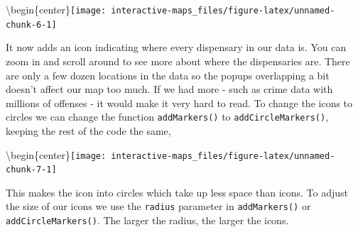 \documentclass[
  12pt,
]{book}
\newenvironment{Shaded}{\begin{snugshade}}{\end{snugshade}}
\newcommand{\DataTypeTok}[1]{\textcolor[rgb]{0.13,0.29,0.53}{#1}}
\newcommand{\DecValTok}[1]{\textcolor[rgb]{0.00,0.00,0.81}{#1}}
\newcommand{\KeywordTok}[1]{\textcolor[rgb]{0.13,0.29,0.53}{\textbf{#1}}}
\newcommand{\NormalTok}[1]{#1}
\newcommand{\OperatorTok}[1]{\textcolor[rgb]{0.81,0.36,0.00}{\textbf{#1}}}
\newcommand{\StringTok}[1]{\textcolor[rgb]{0.31,0.60,0.02}{#1}}
\begin{document}
\textbackslash begin\{center\}\texttt{[image: interactive-maps\_files/figure-latex/unnamed-chunk-6-1]}

It now adds an icon indicating where every dispensary in our data is. You can zoom in and scroll around to see more about where the dispensaries are. There are only a few dozen locations in the data so the popups overlapping a bit doesn't affect our map too much. If we had more - such as crime data with millions of offenses - it would make it very hard to read. To change the icons to circles we can change the function \texttt{addMarkers()} to \texttt{addCircleMarkers()}, keeping the rest of the code the same,

\begin{Shaded}
\end{Shaded}

\textbackslash begin\{center\}\texttt{[image: interactive-maps\_files/figure-latex/unnamed-chunk-7-1]}

This makes the icon into circles which take up less space than icons. To adjust the size of our icons we use the \texttt{radius} parameter in \texttt{addMarkers()} or \texttt{addCircleMarkers()}. The larger the radius, the larger the icons.

\begin{Shaded}
\end{Shaded}
\end{document}

